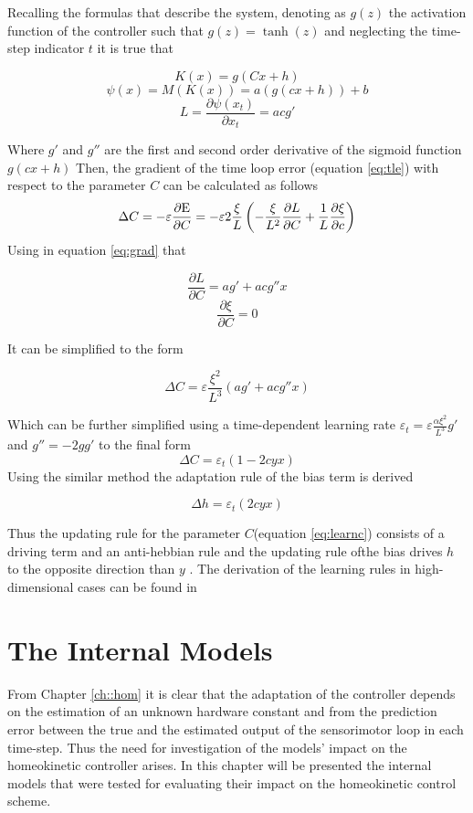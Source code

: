 \documentclass[msc,ai,logo]{infthesis}
\begin{document}
 Recalling the formulas that describe the system, denoting as $g(z)$ the activation function of the controller such that $g(z)=\tanh(z)$ and neglecting the time-step indicator $t$ it is true that 

\[K(x)=g(Cx+h)\]
\[\psi(x)=M(K(x))=a(g(cx+h))+b\]
\[L=\frac{{\partial \psi ({x_t})}}{{\partial {x_t}}}=acg'\]

Where $g'$ and $g''$ are the first and second order derivative of the sigmoid function $g(cx+h)$ Then, the gradient of the time loop error (equation \ref{eq:tle}) with respect to the parameter $C$ can be calculated as follows
\begin{equation}
\Delta C =  - \varepsilon \frac{{\partial {\rm E}}}{{\partial C}} =  - \varepsilon 2\frac{\xi }{L}\left( { - \frac{\xi }{{{L^2}}}\frac{{\partial L}}{{\partial C}} + \frac{1}{L}\frac{{\partial \xi }}{{\partial c}}} \right)
\label{eq:grad}
\end{equation}
Using in equation \ref{eq:grad} that 
 
 \[\frac{{\partial L}}{{\partial C}} = ag' + acg''x\]
 \[\frac{{\partial \xi }}{{\partial C}} = 0\]
 
 It can be simplified to the form 
 
 \[\Delta C = \varepsilon \frac{{{\xi ^2}}}{{{L^3}}}(ag' + acg''x)\]
 
 Which can be further simplified using a time-dependent learning rate ${\varepsilon _t} = \varepsilon \frac{{\alpha {\xi ^2}}}{{{L^3}}}g'$ and $g''=-2gg'$ to the final form 
 \begin{equation}  
\Delta C = \varepsilon _t(1 - 2cyx)
\label{eq:learnc}
 \end{equation}
Using the similar method the adaptation rule of the bias term is derived  

\begin{equation}  
\Delta h = \varepsilon _t(2cyx)
\label{eq:learnh}
 \end{equation}

Thus the updating rule for the parameter $C$(equation \ref{eq:learnc}) consists of a driving term and an anti-hebbian rule and the updating rule ofthe bias drives $h$ to the opposite direction than $y$ \citep[p.45]{martius:diss10}. The derivation of the learning rules in high-dimensional cases can be found in \cite[Ch.~15]{DerMartius11}   


\chapter{The Internal Models}
\label{ch::int}
From Chapter \ref{ch::hom} it is clear that the adaptation of the controller depends on the estimation of an unknown hardware constant and from the prediction error between the true and the estimated output of the sensorimotor loop in each time-step. Thus the need for investigation of the models' impact on the homeokinetic controller arises. In this chapter will be presented the internal models that were tested for evaluating their impact on the homeokinetic control scheme. 
\end{document}
